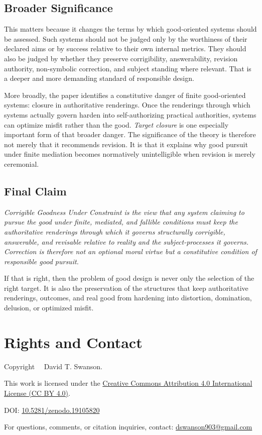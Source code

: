 \documentclass[11pt]{article}
\renewenvironment{quote}
  {\list{}{\leftmargin=1.4em \rightmargin=1.0em}%
   \item\relax\color{softink}\itshape}
  {\endlist}
\renewcommand{\emph}[1]{\textit{#1}}
\begin{document}
\subsection{Broader Significance}

This matters because it changes the terms by which good-oriented systems should be assessed. Such systems should not be judged only by the worthiness of their declared aims or by success relative to their own internal metrics. They should also be judged by whether they preserve corrigibility, answerability, revision authority, non-symbolic correction, and subject standing where relevant. That is a deeper and more demanding standard of responsible design.

More broadly, the paper identifies a constitutive danger of finite good-oriented systems: closure in authoritative renderings. Once the renderings through which systems actually govern harden into self-authorizing practical authorities, systems can optimize misfit rather than the good. \emph{Target closure} is one especially important form of that broader danger. The significance of the theory is therefore not merely that it recommends revision. It is that it explains why good pursuit under finite mediation becomes normatively unintelligible when revision is merely ceremonial.

\subsection{Final Claim}

\begin{quote}
\emph{Corrigible Goodness Under Constraint} is the view that any system claiming to pursue the good under finite, mediated, and fallible conditions must keep the authoritative renderings through which it governs structurally corrigible, answerable, and revisable relative to reality and the subject-processes it governs. Correction is therefore not an optional moral virtue but a constitutive condition of responsible good pursuit.
\end{quote}

If that is right, then the problem of good design is never only the selection of the right target. It is also the preservation of the structures that keep authoritative renderings, outcomes, and real good from hardening into distortion, domination, delusion, or optimized misfit.



\appendix
\section*{Rights and Contact}

\noindent
Copyright \textcopyright\ \the\year\ David T. Swanson.

\noindent
This work is licensed under the
\href{https://creativecommons.org/licenses/by/4.0/}
{Creative Commons Attribution 4.0 International License (CC BY 4.0)}.

\noindent
DOI:
\href{https://doi.org/10.5281/zenodo.19105820}{10.5281/zenodo.19105820}

\noindent
For questions, comments, or citation inquiries, contact:
\href{mailto:dswanson903@gmail.com}{dswanson903@gmail.com}
\end{document}
